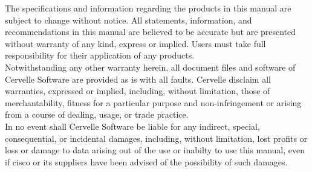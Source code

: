 \documentclass[a4paper, 11pt]{article}
\begin{document}
The specifications and information regarding the products in this manual are subject to change without notice. All statements, information, and recommendations in this manual are believed to be accurate but are presented without warranty of any kind, express or implied. Users must take full responsibility for their application of any products.\\

Notwithstanding any other warranty herein, all document files and software of Cervelle Software are provided as is with all faults. Cervelle disclaim all warranties, expressed or implied, including, without limitation, those of merchantability, fitness for a particular purpose and non-infringement or arising from a course of dealing, usage, or trade practice.\\

In no event shall Cervelle Software be liable for any indirect, special, consequential, or incidental damages, including, without limitation, lost profits or loss or damage to data arising out of the use or inabilty to use this manual, even if cisco or its suppliers have been advised of the possibility of such damages.
\end{document}
